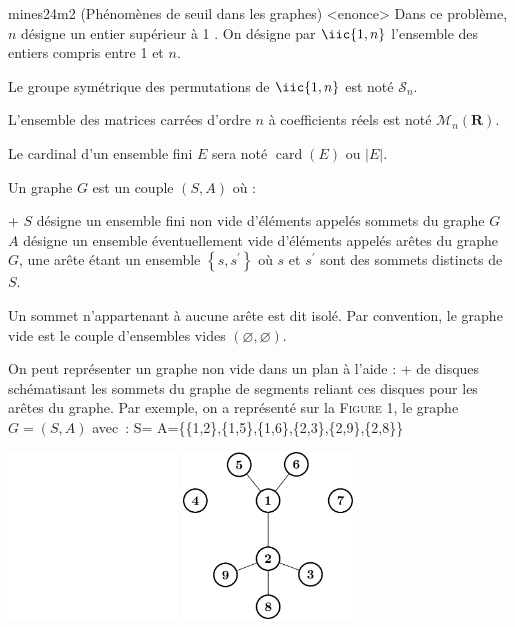 \documentclass[11pt,straight,solution]{cpgedev}
\let\i\isymb
\begin{document}
\titre
\begin{enonce*}{mines24m2}
    (Phénomènes de seuil dans les graphes)
    <enonce>
    \everymath{\displaystyle}
    Dans ce problème, $n$ désigne un entier supérieur à 1 .
    On désigne par $\iic{1,n}$ l'ensemble des entiers compris entre 1 et $n$. 
    
    Le groupe symétrique des permutations de $\iic{ 1, n }$ est noté $\mathcal{S}_n$. 
    
    L'ensemble des matrices carrées d'ordre $n$ à coefficients réels est noté $\mathcal{M}_n(\mathbf{R})$. 


    Le cardinal d'un ensemble fini $E$ sera noté $\operatorname{card}(E)$ ou $|E|$. 

    Un graphe $G$ est un couple $(S, A)$ où :

    \xit\i+
        $S$ désigne un ensemble fini non vide d'éléments appelés sommets du graphe $G$ 
    \xit
        $A$ désigne un ensemble éventuellement vide d'éléments appelés arêtes du graphe $G$, une arête étant un ensemble $\left\{s, s^{\prime}\right\}$ où $s$ et $s^{\prime}$ sont des sommets distincts de $S$.
    \exit

    Un sommet n'appartenant à aucune arête est dit isolé.
    Par convention, le graphe vide est le couple d'ensembles vides $(\varnothing, \varnothing)$.

    On peut représenter un graphe non vide dans un plan à l'aide :
    \xit\i+ 
        de disques schématisant les sommets du graphe
    \xit
        de segments reliant ces disques pour les arêtes du graphe.
    \exit 
    Par exemple, on a représenté sur la \textsc{Figure 1}, le graphe $G=(S, A)$ avec~:
    \<
        S=  
        A=\delim{}\{\{1,2\},\{1,5\},\{1,6\},\{2,3\},\{2,9\},\{2,8\}\}
    \>
    \begin{center}
        \ifdark 
            \includegraphics[width=4.5cm]{graphs/graph-dark-0}
        \else 
            \includegraphics[width=4.5cm]{graphs/graph-0}
        \fi 
    \end{center}




\end{enonce*}
\end{document}
